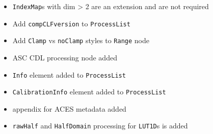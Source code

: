 \label{appendixD}

\vspace{20pt}
\begin{itemize}
    \item \texttt{IndexMap}s with dim \textgreater{} 2 are an extension and are not required
    \item Add \texttt{compCLFversion} to \texttt{ProcessList}
    \item Add \texttt{Clamp} vs \texttt{noClamp} styles to \texttt{Range} node
    \item ASC CDL processing node added
    \item \texttt{Info} element added to \texttt{ProcessList}
    \item \texttt{CalibrationInfo} element added to \texttt{ProcessList}
    \item appendix for ACES metadata added
    \item \texttt{rawHalf} and \texttt{HalfDomain} processing for \texttt{LUT1D}s is added
\end{itemize}